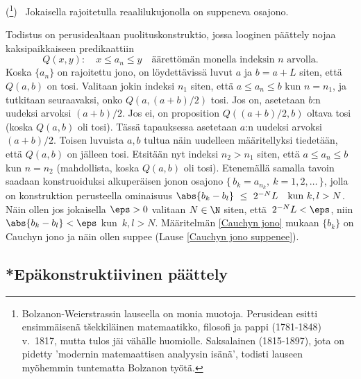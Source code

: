\begin{*Lause} \label{B-W} 
(\footnote[2]{Bolzanon-Weierstrassin lauseella on monia muotoja.
Perusidean esitti ensimmäisenä t\v{s}ekkiläinen matemaatikko, filosofi ja pappi
 (1781-1848) v.\ 1817, mutta tulos jäi vähälle huomiolle. Saksalainen
 (1815-1897), jota on pidetty 'modernin matemaattisen analyysin isänä',
todisti lauseen myöhemmin tuntematta Bolzanon työtä.  
}) \ Jokaisella rajoitetulla reaalilukujonolla on suppeneva osajono. 
\end{*Lause}
\tod Todistus on perusidealtaan puolituskonstruktio, jossa looginen päättely nojaa
kaksipaikkaiseen predikaattiin
\[
Q(x,y): \quad x \le a_n \le y \quad 
\text{äärettömän monella indeksin $n$ arvolla.}
\]
Koska $\{a_n\}$ on rajoitettu jono, on löydettävissä luvut $a$ ja $b=a+L$ siten, että $Q(a,b)$
on tosi. Valitaan jokin indeksi $n_1$ siten, että $a \le a_n \le b$ kun $n=n_1$, ja tutkitaan
seuraavaksi, onko $Q(a,(a+b)/2)$ tosi. Jos on, asetetaan $b$:n uudeksi arvoksi $(a+b)/2$. Jos
ei, on proposition $Q((a+b)/2,b)$ oltava tosi (koska $Q(a,b)$ oli tosi). Tässä tapauksessa
asetetaan $a$:n uudeksi arvoksi $(a+b)/2$. Toisen luvuista $a,b$ tultua näin uudelleen
määritellyksi tiedetään, että $Q(a,b)$ on jälleen tosi. Etsitään nyt indeksi $n_2 > n_1$ siten,
että $a \le a_n \le b$ kun $n=n_2$ (mahdollista, koska $Q(a,b)$ oli tosi). Etenemällä samalla
tavoin saadaan konstruoiduksi alkuperäisen jonon osajono
$\{\,b_k = a_{n_k},\ k = 1,2,\ldots\,\}$, jolla on konstruktion perusteella ominaisuus
$\abs{b_k - b_l}\ \le\ 2^{-N} L \quad \text{kun}\ k,l > N$. Näin ollen jos jokaisella $\eps>0$
valitaan $N\in\N$ siten, että $\,2^{-N}L<\eps$, niin 
$\abs{b_k-b_l}<\eps$ kun $\,k,l>N$. Määritelmän \ref{Cauchyn jono} mukaan $\{b_k\}$ on Cauchyn
jono ja näin ollen suppee (Lause \ref{Cauchyn jono suppenee}). \loppu

\subsection{*Epäkonstruktiivinen päättely}

